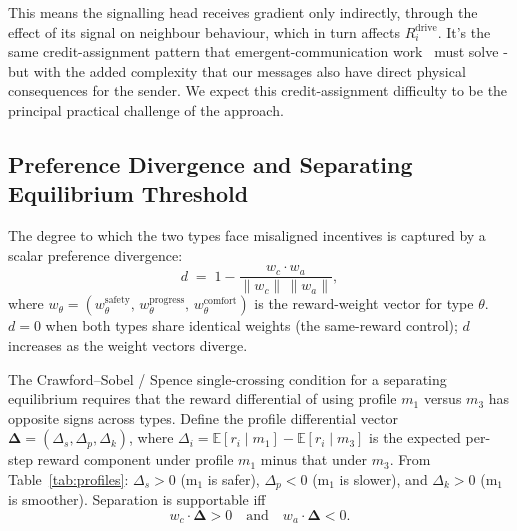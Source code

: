\documentclass[12pt,a4paper]{article}
\begin{document}
This means the signalling head receives gradient only indirectly, through the effect of its signal
on neighbour behaviour, which in turn affects $R^{\mathrm{drive}}_i$. It's the same
credit-assignment pattern that emergent-communication work~\cite{foerster2016learning} must
solve - but with the added complexity that our messages also have direct physical consequences
for the sender. We expect this credit-assignment difficulty to be the principal practical challenge
of the approach.

\subsection{Preference Divergence and Separating Equilibrium Threshold}

The degree to which the two types face misaligned incentives is captured by a scalar
preference divergence:
\begin{equation}
    d \;=\; 1 - \frac{w_c \cdot w_a}{\|w_c\|\,\|w_a\|},
    \label{eq:divergence}
\end{equation}
where $w_\theta = (w^\text{safety}_\theta,\, w^\text{progress}_\theta,\,
w^\text{comfort}_\theta)$ is the reward-weight vector for type $\theta$. $d = 0$ when both
types share identical weights (the same-reward control); $d$ increases as the weight vectors
diverge.

The Crawford--Sobel / Spence single-crossing condition for a separating equilibrium requires
that the reward differential of using profile $m_1$ versus $m_3$ has opposite signs across
types. Define the profile differential vector
$\boldsymbol{\Delta} = (\Delta_s, \Delta_p, \Delta_k)$, where
$\Delta_i = \mathbb{E}[r_i \mid m_1] - \mathbb{E}[r_i \mid m_3]$ is the expected per-step
reward component under profile $m_1$ minus that under $m_3$. From Table~\ref{tab:profiles}:
$\Delta_s > 0$ (m$_1$ is safer), $\Delta_p < 0$ (m$_1$ is slower), and $\Delta_k > 0$
(m$_1$ is smoother). Separation is supportable iff
\begin{equation}
    w_c \cdot \boldsymbol{\Delta} > 0
    \quad \text{and} \quad
    w_a \cdot \boldsymbol{\Delta} < 0.
    \label{eq:single-crossing}
\end{equation}
\end{document}
